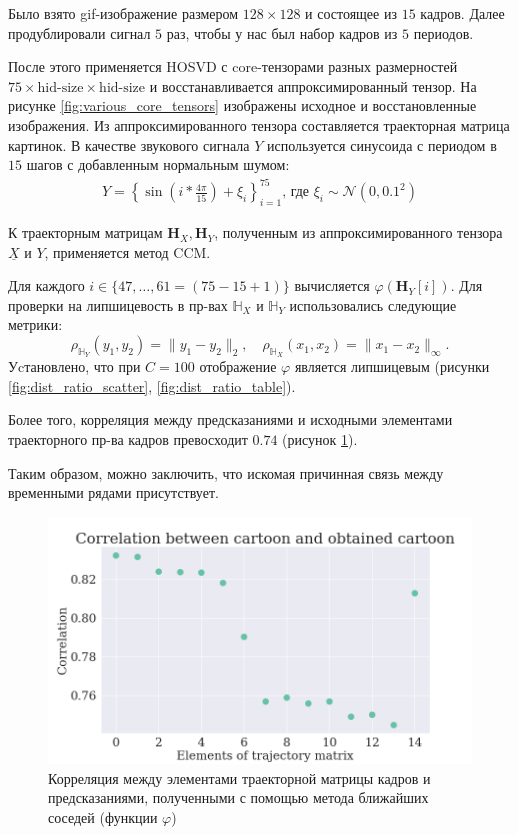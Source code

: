 \documentclass[a4paper,14pt]{article}
\newcommand{\uX}{\ensuremath{\underline{X}}}
\newcommand{\bH}{\mathbf{H}}
\newcommand{\dH}{\mathbb{H}}
\theoremstyle{plain} %
\theoremstyle{definition} %
\theoremstyle{remark} %
\begin{document}
	Было взято gif-изображение размером $128 \times 128$ и состоящее из $15$ кадров. 
	Далее продублировали сигнал $5$ раз, чтобы у нас был набор кадров из $5$ периодов. 
	
	После этого применяется HOSVD с core-тензорами разных размерностей $75 \times \text{hid-size} \times \text{hid-size}$ и восстанавливается аппроксимированный тензор. На рисунке \ref{fig:various_core_tensors} изображены исходное и восстановленные изображения. 
	Из аппроксимированного тензора составляется траекторная матрица картинок. 
	В качестве звукового сигнала $Y$ используется синусоида с периодом в $15$ шагов с добавленным нормальным шумом:
	\begin{gather*}
		Y = \left\{\sin\left(i * \frac{4 \pi}{15} \right) + \xi_i \right\}_{i=1}^{75} \text{, где } \xi_i \sim \mathcal{N}(0, 0.1^2)
	\end{gather*}
	
	К траекторным матрицам $\bH_X, \bH_Y$, полученным из аппроксимированного тензора $\uX$ и $Y$, применяется метод CCM. 
	
	Для каждого $i \in \{ 47, \ldots, 61 = (75-15+1)\}$ вычисляется $\varphi(\bH_Y[i])$. Для проверки на липшицевость в пр-вах $\dH_X$ и $\dH_Y$ использовались следующие метрики:
	$$ \rho_{\dH_Y}(y_1, y_2) = \| y_1 - y_2 \|_2, \quad \rho_{\dH_X}(x_1, x_2) = \| x_1 - x_2 \|_{\infty}.$$
	Уcтановлено, что при $C = 100$ отображение $\varphi$ является липшицевым (рисунки \ref{fig:dist_ratio_scatter}, \ref{fig:dist_ratio_table}).  
	
	Более того, корреляция между предсказаниями и исходными элементами траекторного пр-ва кадров превосходит $0.74$ (рисунок \ref{fig:corr_plot}).  
	
	Таким образом, можно заключить, что искомая причинная связь между временными рядами присутствует.
	
	\begin{figure}[bhtp]
		\centering
		\includegraphics[width=\linewidth]{../correlation_plot.png}
		\caption{Корреляция между элементами траекторной матрицы кадров и предсказаниями, полученными с помощью метода ближайших соседей (функции $\varphi$)}
		\label{fig:corr_plot}
	\end{figure}
\end{document}
